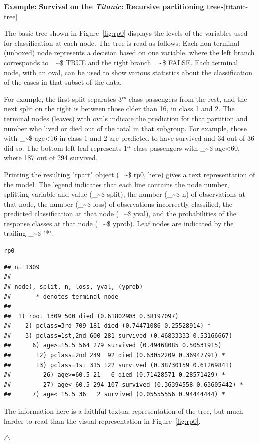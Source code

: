 \documentclass{article}
\makeatletter
\newcommand{\hlstd}[1]{\textcolor[rgb]{0.345,0.345,0.345}{#1}}%
\newenvironment{kframe}{%
 \def\at@end@of@kframe{}%
 \ifinner\ifhmode%
  \def\at@end@of@kframe{\end{minipage}}%
  \begin{minipage}{\columnwidth}%
 \fi\fi%
 \def\FrameCommand##1{\hskip\@totalleftmargin \hskip-\fboxsep
 \colorbox{shadecolor}{##1}\hskip-\fboxsep
     \hskip-\linewidth \hskip-\@totalleftmargin \hskip\columnwidth}%
 \MakeFramed {\advance\hsize-\width
   \@totalleftmargin\z@ \linewidth\hsize
   \@setminipage}}%
 {\par\unskip\endMakeFramed%
 \at@end@of@kframe}
\newenvironment{knitrout}{}{} %
\newcommand{\figref}[1]{Figure~\ref{#1}}
\newcommand{\class}[1]{\textsf{"#1"}}
\newcommand\code{\bgroup\@makeother\_\@makeother\~\@makeother\$\@codex}
\def\@codex#1{{\normalfont\ttfamily\hyphenchar\font=-1 #1}\egroup}
\newenvironment{Example}[2][unnamed-example]%
  {\medskip\noindent\textbf{\textsf{Example:}}
   \textbf{#2}\hfill [#1]\par\smallskip
  }
  {\hfill $\triangle$}
\makeatother
\begin{document}
\begin{Example}[titanic-tree]{Survival on the \emph{Titanic}: Recursive partitioning trees}
\begin{knitrout}
\end{knitrout}

The basic tree shown
in \figref{fig:rp0} displays the levels of the variables used for
classification at each node. 
The tree is read as follows:
Each non-terminal (unboxed) node represents a decision based on one variable,
where the left branch corresponds to \code{TRUE} and the right branch \code{FALSE}.
Each terminal node, with an oval, can be used to show various statistics about
the classification of the cases in that subset of the data.


For example, the first split separates 3$^{rd}$
class passengers from the rest, and the next split on the right is between those older
than 16, in class 1 and 2.  
The terminal nodes (leaves) with ovals indicate the
prediction for that partition and number who lived or died out of the
total in that subgroup. For example, those with \code{age<16} in class
1 and 2 are predicted to have survived and 34 out of 36 did so.
The bottom left leaf represents 1$^{st}$ class passengers with \code{age<60},
where 187 out of 294 survived.

Printing the resulting \class{rpart} object
(\code{rp0}, here) gives a text representation of the model.
The legend indicates that each line contains the node number,
splitting variable and value (\code{split}), 
the number (\code{n}) of observations at that node,
the number (\code{loss}) of observations incorrectly classified,
the predicted classification at that node (\code{yval}),
and the probabilities of the response classes at that node
(\code{yprob}).  Leaf nodes are indicated by the trailing \code{"*"}.
\begin{knitrout}
\color{fgcolor}\begin{kframe}
\begin{alltt}
\hlstd{rp0}
\end{alltt}
\begin{verbatim}
## n= 1309 
## 
## node), split, n, loss, yval, (yprob)
##       * denotes terminal node
## 
##  1) root 1309 500 died (0.61802903 0.38197097)  
##    2) pclass=3rd 709 181 died (0.74471086 0.25528914) *
##    3) pclass=1st,2nd 600 281 survived (0.46833333 0.53166667)  
##      6) age>=15.5 564 279 survived (0.49468085 0.50531915)  
##       12) pclass=2nd 249  92 died (0.63052209 0.36947791) *
##       13) pclass=1st 315 122 survived (0.38730159 0.61269841)  
##         26) age>=60.5 21   6 died (0.71428571 0.28571429) *
##         27) age< 60.5 294 107 survived (0.36394558 0.63605442) *
##      7) age< 15.5 36   2 survived (0.05555556 0.94444444) *
\end{verbatim}
\end{kframe}
\end{knitrout}
The information here is a faithful textual representation of the
tree, but much harder to read than the visual representation in
\figref{fig:rp0}.



\end{Example}
\end{document}
